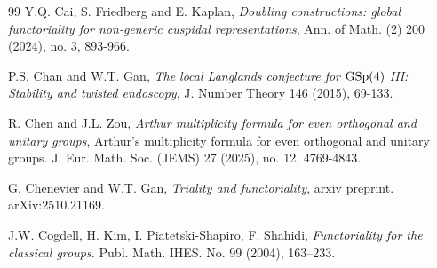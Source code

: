 \documentclass[11pt]{amsart}
\theoremstyle{plain}
\numberwithin{equation}{section}
\def\GSp{{\rm GSp}}
\def\GL{{\rm GL}}
\begin{document}
\begin{thebibliography}{99}
 Y.Q. Cai, S. Friedberg and E. Kaplan, {\em Doubling constructions: global functoriality for non-generic cuspidal representations},  Ann. of Math. (2) 200 (2024), no. 3, 893-966.

 P.S. Chan and W.T. Gan, {\em The local Langlands conjecture for $\GSp(4)$ III: Stability and twisted endoscopy},  J. Number Theory 146 (2015), 
69-133.


 


 R. Chen and J.L. Zou, {\em Arthur multiplicity formula for even orthogonal and unitary groups}, 
Arthur's multiplicity formula for even orthogonal and unitary groups. J. Eur. Math. Soc. (JEMS) 27 (2025), no. 12, 4769-4843.


 G. Chenevier and W.T. Gan, {\em Triality and functoriality}, arxiv preprint. arXiv:2510.21169.


 

 J.W. Cogdell, H. Kim, I. Piatetski-Shapiro, F. Shahidi, {\em Functoriality for the classical groups.} 
 Publ. Math. IHES. No. 99 (2004), 163--233. 

 
 
 

\end{thebibliography}
\end{document}
